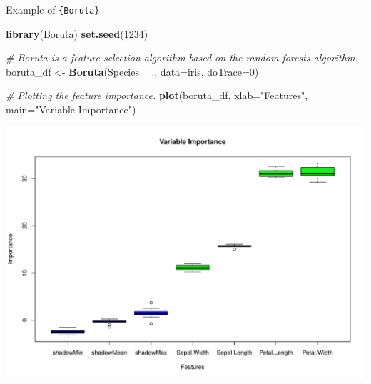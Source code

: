 \documentclass[12pt,ignorenonframetext,]{beamer}
\newenvironment{Shaded}{\begin{snugshade}}{\end{snugshade}}
\newcommand{\CommentTok}[1]{\textcolor[rgb]{0.56,0.35,0.01}{\textit{#1}}}
\newcommand{\DataTypeTok}[1]{\textcolor[rgb]{0.13,0.29,0.53}{#1}}
\newcommand{\DecValTok}[1]{\textcolor[rgb]{0.00,0.00,0.81}{#1}}
\newcommand{\KeywordTok}[1]{\textcolor[rgb]{0.13,0.29,0.53}{\textbf{#1}}}
\newcommand{\NormalTok}[1]{#1}
\newcommand{\OperatorTok}[1]{\textcolor[rgb]{0.81,0.36,0.00}{\textbf{#1}}}
\newcommand{\StringTok}[1]{\textcolor[rgb]{0.31,0.60,0.02}{#1}}
\begin{document}
\begin{frame}[fragile]{Example of \texttt{\{Boruta\}}}
\protect\hypertarget{example-of-1}{}

\tiny

\begin{Shaded}
\begin{Highlighting}[]
\KeywordTok{library}\NormalTok{(Boruta)}
\KeywordTok{set.seed}\NormalTok{(}\DecValTok{1234}\NormalTok{)}

\CommentTok{# Boruta is a feature selection algorithm based on the random forests algorithm.}
\NormalTok{boruta_df <-}\StringTok{ }\KeywordTok{Boruta}\NormalTok{(Species }\OperatorTok{~}\StringTok{ }\NormalTok{., }\DataTypeTok{data=}\NormalTok{iris, }\DataTypeTok{doTrace=}\DecValTok{0}\NormalTok{)}

\CommentTok{# Plotting the feature importance.}
\KeywordTok{plot}\NormalTok{(boruta_df, }\DataTypeTok{xlab=}\StringTok{"Features"}\NormalTok{, }\DataTypeTok{main=}\StringTok{"Variable Importance"}\NormalTok{)}
\end{Highlighting}
\end{Shaded}

\begin{center}\includegraphics[width=0.7\linewidth,height=0.6\textheight]{figs/unnamed-chunk-3} \end{center}

\normalsize

\end{frame}
\end{document}
